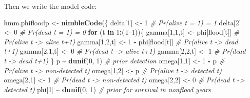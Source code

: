 \documentclass[
  12pt,
]{krantz}
\newenvironment{Shaded}{\begin{snugshade}}{\end{snugshade}}
\newcommand{\CommentTok}[1]{\textcolor[rgb]{0.56,0.35,0.01}{\textit{#1}}}
\newcommand{\ControlFlowTok}[1]{\textcolor[rgb]{0.13,0.29,0.53}{\textbf{#1}}}
\newcommand{\DecValTok}[1]{\textcolor[rgb]{0.00,0.00,0.81}{#1}}
\newcommand{\FunctionTok}[1]{\textcolor[rgb]{0.13,0.29,0.53}{\textbf{#1}}}
\newcommand{\NormalTok}[1]{#1}
\newcommand{\OtherTok}[1]{\textcolor[rgb]{0.56,0.35,0.01}{#1}}
\newcommand{\SpecialCharTok}[1]{\textcolor[rgb]{0.81,0.36,0.00}{\textbf{#1}}}
\begin{document}
Then we write the model code:

\begin{Shaded}
\begin{Highlighting}[]
\NormalTok{hmm.phifloodp }\OtherTok{\textless{}{-}} \FunctionTok{nimbleCode}\NormalTok{(\{}
\NormalTok{  delta[}\DecValTok{1}\NormalTok{] }\OtherTok{\textless{}{-}} \DecValTok{1}                        \CommentTok{\# Pr(alive t = 1) = 1}
\NormalTok{  delta[}\DecValTok{2}\NormalTok{] }\OtherTok{\textless{}{-}} \DecValTok{0}                        \CommentTok{\# Pr(dead t = 1) = 0}
  \ControlFlowTok{for}\NormalTok{ (t }\ControlFlowTok{in} \DecValTok{1}\SpecialCharTok{:}\NormalTok{(T}\DecValTok{{-}1}\NormalTok{))\{}
\NormalTok{    gamma[}\DecValTok{1}\NormalTok{,}\DecValTok{1}\NormalTok{,t] }\OtherTok{\textless{}{-}}\NormalTok{ phi[flood[t]]      }\CommentTok{\# Pr(alive t {-}\textgreater{} alive t+1)}
\NormalTok{    gamma[}\DecValTok{1}\NormalTok{,}\DecValTok{2}\NormalTok{,t] }\OtherTok{\textless{}{-}} \DecValTok{1} \SpecialCharTok{{-}}\NormalTok{ phi[flood[t]]  }\CommentTok{\# Pr(alive t {-}\textgreater{} dead t+1)}
\NormalTok{    gamma[}\DecValTok{2}\NormalTok{,}\DecValTok{1}\NormalTok{,t] }\OtherTok{\textless{}{-}} \DecValTok{0}                  \CommentTok{\# Pr(dead t {-}\textgreater{} alive t+1)}
\NormalTok{    gamma[}\DecValTok{2}\NormalTok{,}\DecValTok{2}\NormalTok{,t] }\OtherTok{\textless{}{-}} \DecValTok{1}                  \CommentTok{\# Pr(dead t {-}\textgreater{} dead t+1)}
\NormalTok{  \}}
\NormalTok{  p }\SpecialCharTok{\textasciitilde{}} \FunctionTok{dunif}\NormalTok{(}\DecValTok{0}\NormalTok{, }\DecValTok{1}\NormalTok{)        }\CommentTok{\# prior detection}
\NormalTok{  omega[}\DecValTok{1}\NormalTok{,}\DecValTok{1}\NormalTok{] }\OtherTok{\textless{}{-}} \DecValTok{1} \SpecialCharTok{{-}}\NormalTok{ p    }\CommentTok{\# Pr(alive t {-}\textgreater{} non{-}detected t)}
\NormalTok{  omega[}\DecValTok{1}\NormalTok{,}\DecValTok{2}\NormalTok{] }\OtherTok{\textless{}{-}}\NormalTok{ p        }\CommentTok{\# Pr(alive t {-}\textgreater{} detected t)}
\NormalTok{  omega[}\DecValTok{2}\NormalTok{,}\DecValTok{1}\NormalTok{] }\OtherTok{\textless{}{-}} \DecValTok{1}        \CommentTok{\# Pr(dead t {-}\textgreater{} non{-}detected t)}
\NormalTok{  omega[}\DecValTok{2}\NormalTok{,}\DecValTok{2}\NormalTok{] }\OtherTok{\textless{}{-}} \DecValTok{0}        \CommentTok{\# Pr(dead t {-}\textgreater{} detected t)}
\NormalTok{  phi[}\DecValTok{1}\NormalTok{] }\SpecialCharTok{\textasciitilde{}} \FunctionTok{dunif}\NormalTok{(}\DecValTok{0}\NormalTok{, }\DecValTok{1}\NormalTok{)   }\CommentTok{\# prior for survival in nonflood years}

\end{Highlighting}
\end{Shaded}
\end{document}
